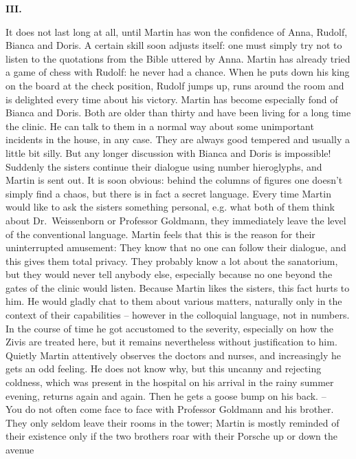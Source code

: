 \begin {center} 
{\bf III.} 
\end {center}
It does not last long at all, until Martin has won the confidence of Anna, Rudolf, 
Bianca and Doris. 
A certain skill soon adjusts itself: one must simply try not to listen to the 
quotations from the Bible uttered by Anna. 
Martin has already tried a game of chess with Rudolf: he never had a chance.
When he puts down his king on the board at the check position, Rudolf jumps up, 
runs around the room and is delighted every time about his victory. 
Martin has become especially fond of Bianca and Doris.
Both are older than thirty and have been living for a long time the clinic. 
He can talk to them in a normal way about some unimportant incidents in the house, 
in any case. 
They are always good tempered and usually a little bit silly. 
But any longer discussion with Bianca and Doris is impossible! 
Suddenly the sisters continue their dialogue using number hieroglyphs, and Martin is 
sent out. 
It is soon obvious: behind the columns of figures one doesn't simply find a chaos, 
but there is in fact a secret language.
Every time Martin would like to ask the sisters something personal, e.g. what both 
of them think about Dr.~Weissenborn or Professor Goldmann, they immediately leave 
the level of the conventional language. 
Martin feels that this is the reason for their uninterrupted amusement: They know 
that no one can follow their dialogue, and this gives them total privacy. 
They probably know a lot about the sanatorium, but they would never tell anybody 
else, especially because no one beyond the gates of the clinic would listen. 
Because Martin likes the sisters, this fact hurts to him. 
He would gladly chat to them about various matters, naturally only in the context of 
their capabilities -- however in the colloquial language, not in numbers.
In the course of time he got accustomed to the severity, especially on how the Zivis 
are treated here, but it remains nevertheless without justification to him. 
Quietly Martin attentively observes the doctors and nurses, and increasingly he 
gets an odd feeling. 
He does not know why, but this uncanny and rejecting coldness, which was present in 
the hospital on his arrival in the rainy summer evening, returns again and again. 
Then he gets a goose bump on his back. -- \\
You do not often come face to face with Professor Goldmann and his brother. 
They only seldom leave their rooms in the tower; Martin is mostly reminded of their 
existence only if the two brothers roar with their Porsche up or down the avenue 
